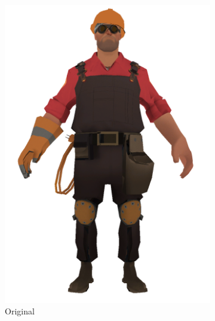 
\newpage
{}

\begin{figure}[h]
    \centering
        \begin{subfigure}[b]{0.2\textwidth}
        \includegraphics[width=\textwidth]{img/textures/Original.png}
        \caption{Original}
        \label{fig:Original}
    \end{subfigure}
    ~
    \centering
    \begin{subfigure}[b]{0.2\textwidth}

\end{subfigure}
\end{figure}
